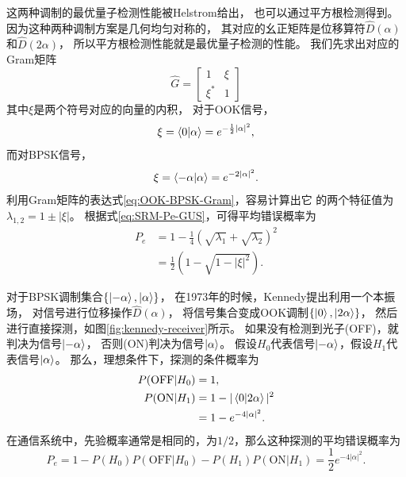 这两种调制的最优量子检测性能被Helstrom给出\cite{helstrom1976quantum}，
也可以通过平方根检测得到。因为这种两种调制方案是几何均匀对称的，
其对应的幺正矩阵是位移算符$\hat{D}(\alpha)$和$\hat{D}(2\alpha)$，
所以平方根检测性能就是最优量子检测的性能。
我们先求出对应的Gram矩阵
\begin{equation}
\hat{G} = \begin{bmatrix}
            1  &   \xi  \\
            \xi^*  &  1
          \end{bmatrix}
\label{eq:OOK-BPSK-Gram}
\end{equation}
其中$\xi$是两个符号对应的向量的内积，
对于OOK信号，
\begin{equation}
\xi = \bra{0}\ket{\alpha} = e^{-\frac{1}{2}|\alpha|^2},
\end{equation}
而对BPSK信号，
\begin{equation}
\xi = \bra{-\alpha}\ket{\alpha} = e^{-2|\alpha|^2}.
\end{equation}
利用Gram矩阵的表达式\ref{eq:OOK-BPSK-Gram}，容易计算出它
的两个特征值为$\lambda_{1,2} = 1 \pm |\xi|$。
根据式\ref{eq:SRM-Pe-GUS}，可得平均错误概率为
\begin{equation}
\begin{split}
P_e  &= 1 - \frac{1}{4}(\sqrt{\lambda_1} + \sqrt{\lambda_2})^2\\
     & = \frac{1}{2} \left(1 - \sqrt{1 - |\xi|^2} \right).
\label{eq:OOK-BPSK-Pe-Hel}
\end{split}
\end{equation}

对于BPSK调制集合$\{\ket{-\alpha}, \ket{\alpha} \}$，
在1973年的时候，Kennedy提出\cite{kennedy1973near}利用一个本振场，
对信号进行位移操作$\hat{D}(\alpha)$，
将信号集合变成OOK调制$\{\ket{0}, \ket{2\alpha} \}$，
然后进行直接探测，如图\ref{fig:kennedy-receiver}所示。
如果没有检测到光子(OFF)，就判决为信号$\ket{-\alpha}$，
否则(ON)判决为信号$\ket{\alpha}$。
假设$H_0$代表信号$\ket{-\alpha}$，假设$H_1$代表信号$\ket{\alpha}$。
那么，理想条件下，探测的条件概率为
\begin{equation}
\begin{split}
P(\text{OFF}|H_0) & = 1, \\
P(\text{ON}|H_1)  & = 1 - |\bra{0}\ket{2\alpha}|^2 \\
                  & = 1 - e^{-4|\alpha|^2}.
\end{split}
\end{equation}
在通信系统中，先验概率通常是相同的，为$1/2$，那么这种探测的平均错误概率为
\begin{equation}
P_e  = 1 - P(H_0)P(\text{OFF}|H_0) - P(H_1)P(\text{ON}|H_1) = \frac{1}{2}e^{-4|\alpha|^2}.
\label{eq:BPSK-Kennedy}
\end{equation}



